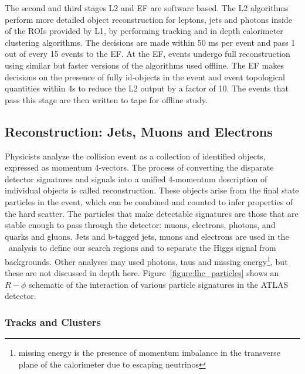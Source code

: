 The second and third stages L2 and EF are software based. The L2 algorithms perform more detailed object reconstruction for leptons, jets and photons inside of the ROIs provided by L1, by performing tracking and in depth calorimeter clustering algorithms. The decisions are made within 50 ms per event and pass 1 out of every 15 events to the EF. At the EF, events undergo full reconstruction using similar but faster versions of the algorithms used offline. The EF makes decisions on the presence of fully id-objects in the event and event topological quantities within 4s to reduce the L2 output by a factor of 10. The events that pass this stage are then written to tape for offline study.



\subsection{Reconstruction: Jets, Muons and Electrons}

Physicists analyze the collision event as a collection of identified objects, expressed as momentum 4-vectors. The process of converting the disparate detector signatures and signals into a unified 4-momentum description of individual objects is called reconstruction. These objects arise from the final state particles in the event, which can be combined and counted to infer properties of the hard scatter. The particles that make detectable signatures are those that are stable enough to pass through the detector: muons, electrons, photons, and quarks and gluons. Jets and b-tagged jets, muons and electrons are used in the \tth\ analysis to define our search regions and to separate the Higgs signal from backgrounds. Other analyses may used photons, taus and missing energy\footnote{missing energy is the presence of momentum imbalance in the transverse plane of the calorimeter due to escaping neutrinos}, but these are not discussed in depth here. Figure~\ref{figure:lhc_particles} shows an $R-\phi$ schematic of the interaction of various particle signatures in the ATLAS detector.  

 

\subsubsection{Tracks and Clusters}

